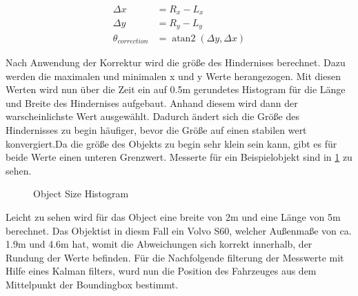 \documentclass[11pt,oneside,openright]{mpreport}
\DeclareMathOperator{\atantwo}{atan2}
\begin{document}
\begin{align*}
\Delta x &= R_x - L_x\\
\Delta y &= R_y - L_y\\
\theta_{correction} &= \atantwo(\Delta y,\Delta x)
\end{align*}

Nach Anwendung der Korrektur wird die größe des Hindernises berechnet. Dazu werden die maximalen und minimalen x und y Werte herangezogen.
Mit diesen Werten wird nun über die Zeit ein auf 0.5m gerundetes Histogram für die Länge und Breite des Hindernises aufgebaut.
Anhand diesem wird dann der warscheinlichste Wert ausgewählt. Dadurch ändert sich die Größe des Hindernisses zu begin häufiger,
bevor die Größe auf einen stabilen wert konvergiert.Da die größe des Objekts zu begin sehr klein sein kann, 
gibt es für beide Werte einen unteren Grenzwert. Messerte für ein Beispielobjekt sind in \cref{obst_hist} zu sehen.
\begin{figure}[!ht]
\caption{Object Size Histogram}
\label{obst_hist}
\end{figure}

Leicht zu sehen wird für das Object eine breite von 2m und eine Länge von 5m berechnet. Das Objektist in diesm Fall ein Volvo S60, welcher Außenmaße von ca. 1.9m und 4.6m hat,
womit die Abweichungen sich korrekt innerhalb, der Rundung der Werte befinden. Für die Nachfolgende filterung der Messwerte mit Hilfe eines Kalman filters, wurd nun
die Position des Fahrzeuges aus dem Mittelpunkt der Boundingbox bestimmt.
\end{document}
